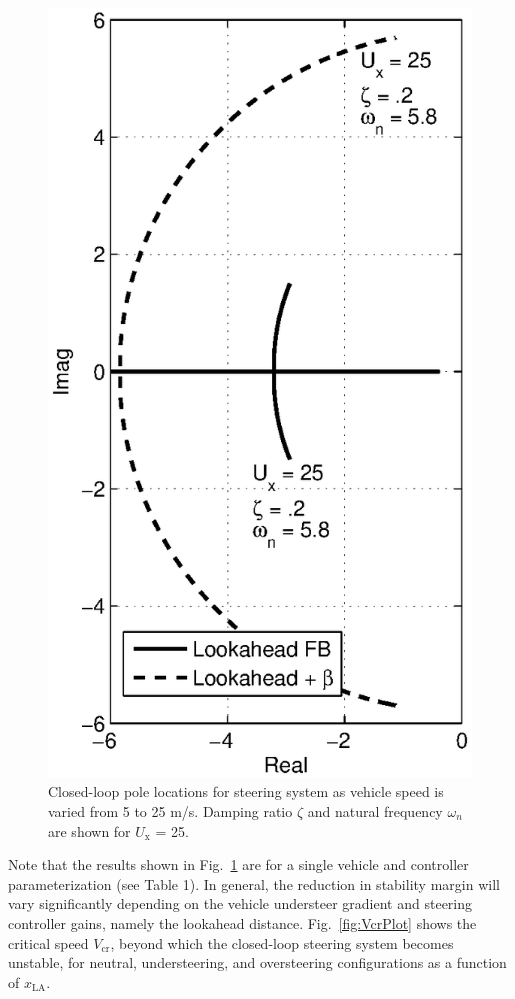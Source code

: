 \documentclass{nVSD2e}
\theoremstyle{plain}
\theoremstyle{definition}
\theoremstyle{remark}
\begin{document}
\begin{figure}[h]
\centering
\includegraphics[width=.55\columnwidth]{figures/rLocus.eps}
\caption{Closed-loop pole locations for steering system as vehicle speed is varied from 5 to 25 m/s. Damping ratio $\zeta$ and natural
frequency $\omega_n$ are shown for $U_\mathrm{x}$ = 25.}
\label{fig:rLocusPlot}
\end{figure}

Note that the results shown in Fig.~\ref{fig:rLocusPlot} are for a single vehicle and controller parameterization (see Table 1). 
In general, the reduction in stability margin will vary significantly depending on the vehicle understeer gradient and steering controller gains, namely
the lookahead distance. Fig.~\ref{fig:VcrPlot} shows the critical speed $V_\mathrm{cr}$, beyond which the closed-loop 
steering system becomes unstable, for neutral, understeering, and oversteering configurations as a function of $x_\mathrm{LA}$.   
\end{document}
